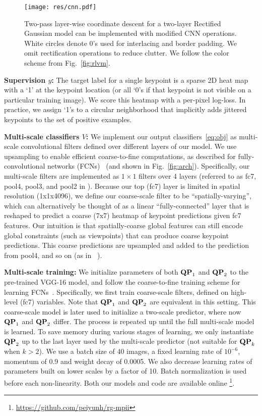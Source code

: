 \documentclass[10pt,twocolumn,letterpaper]{article}
\newcommand{\QP}[1]{{${\bf QP}_{#1}$}}
\begin{document}
\begin{figure}[t!]
  \centering
  \texttt{[image: res/cnn.pdf]}
\caption{Two-pass layer-wise coordinate descent for a two-layer Rectified Gaussian
    model can be implemented with modified CNN operations. White
    circles denote 0's used for interlacing and border padding. We
    omit rectification operations to reduce clutter. We follow the
    color scheme from Fig.~\ref{fig:rlvm}. }
  \label{fig:cnn}
\end{figure}

{\bf Supervision $y$:} The target label for a single keypoint is a
sparse 2D heat map with a `1' at the keypoint location (or all `0's if
that keypoint is not visible on a particular training image). We score
this heatmap with a per-pixel log-loss. In practice, we assign `1's to
a circular neighborhood that implicitly adds jittered keypoints to the
set of positive examples. 


{\bf Multi-scale classifiers $V$:} We implement our output
classifiers~\eqref{eq:obj} as multi-scale convolutional filters
defined over different layers of our model. We use upsampling to
enable efficient coarse-to-fine computations, as described for
fully-convolutional networks (FCNs)~\cite{long2014fully} (and shown in
Fig.~\ref{fig:arch}). Specifically, our multi-scale filters are
implemented as $1\times1$ filters over 4 layers (referred to as fc7, pool4,
pool3, and pool2 in \cite{simonyan2014very}). Because our top (fc7)
layer is limited in spatial resolution (1x1x4096), we define our
coarse-scale filter to be ``spatially-varying'', which can
alternatively be thought of as a linear ``fully-connected'' layer that
is reshaped to predict a coarse (7x7) heatmap of keypoint predictions
given fc7 features. Our intuition is that spatially-coarse global
features can still encode global constraints (such as viewpoints) that
can produce coarse keypoint predictions. This coarse predictions are
upsampled and added to the prediction from pool4, and so on (as in
~\cite{long2014fully}).


{\bf Multi-scale training:} We initialize parameters of both \QP{1}
and \QP{2} to the pre-trained VGG-16 model\cite{simonyan2014very}, and
follow the coarse-to-fine training scheme for learning
FCNs~\cite{long2014fully}. Specifically, we first train coarse-scale
filters, defined on high-level (fc7) variables.
Note that \QP{1} and \QP{2} are equivalent in this setting. This
coarse-scale model is later used to initialize a two-scale predictor,
where now \QP{1} and \QP{2} differ. 
The process is repeated up until the full multi-scale model is
learned. To save memory during various stages of learning, we only
instantiate \QP{2} up to the last layer used by the multi-scale
predictor (not suitable for \QP{k} when $k>2$). We use a batch size of
40 images, a fixed learning rate of $10^{-6}$, momentum of 0.9 and
weight decay of 0.0005. We also decrease learning rates of parameters
built on lower scales \cite{long2014fully} by a factor of 10. Batch
normalization\cite{ioffe2015batch} is used before each
non-linearity. Both our models and code are
available online \footnote{\url{https://github.com/peiyunh/rg-mpii}}.
\end{document}
